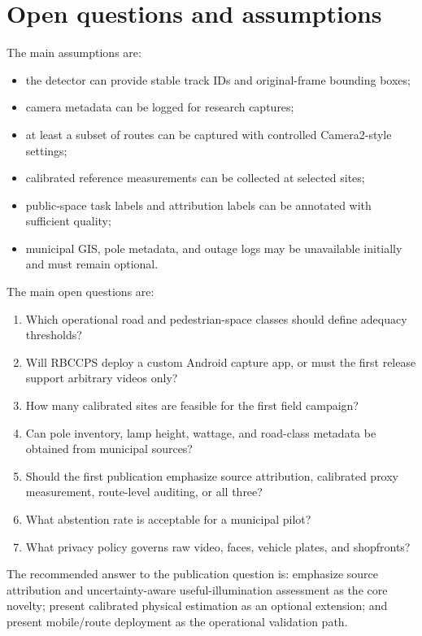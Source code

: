 \documentclass[11pt]{article}
\begin{document}
\section{Open questions and assumptions}

The main assumptions are:
\begin{itemize}
  \item the detector can provide stable track IDs and original-frame bounding boxes;
  \item camera metadata can be logged for research captures;
  \item at least a subset of routes can be captured with controlled Camera2-style settings;
  \item calibrated reference measurements can be collected at selected sites;
  \item public-space task labels and attribution labels can be annotated with sufficient quality;
  \item municipal GIS, pole metadata, and outage logs may be unavailable initially and must remain optional.
\end{itemize}

The main open questions are:
\begin{enumerate}
  \item Which operational road and pedestrian-space classes should define adequacy thresholds?
  \item Will RBCCPS deploy a custom Android capture app, or must the first release support arbitrary videos only?
  \item How many calibrated sites are feasible for the first field campaign?
  \item Can pole inventory, lamp height, wattage, and road-class metadata be obtained from municipal sources?
  \item Should the first publication emphasize source attribution, calibrated proxy measurement, route-level auditing, or all three?
  \item What abstention rate is acceptable for a municipal pilot?
  \item What privacy policy governs raw video, faces, vehicle plates, and shopfronts?
\end{enumerate}

The recommended answer to the publication question is: emphasize source attribution and uncertainty-aware useful-illumination assessment as the core novelty; present calibrated physical estimation as an optional extension; and present mobile/route deployment as the operational validation path.
\end{document}
